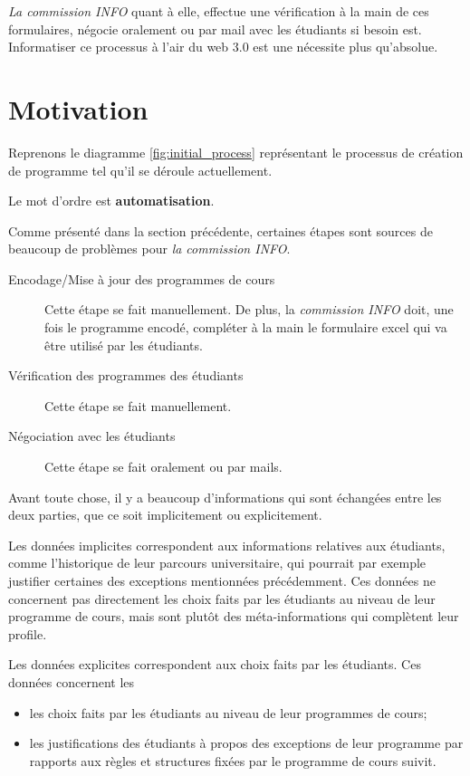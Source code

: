 \textit{La commission INFO} quant à elle, effectue une vérification à la main de ces formulaires, négocie oralement ou par mail avec les étudiants si besoin est. 
Informatiser ce processus à l'air du web 3.0 est une nécessite plus qu'absolue.



\section{Motivation}
Reprenons le diagramme \ref{fig:initial_process} représentant le processus de création de programme tel qu'il se déroule actuellement. 

Le mot d'ordre est \textbf{automatisation}.

Comme présenté dans la section précédente, certaines étapes sont sources de beaucoup de problèmes pour \textit{la commission INFO}.

\begin{description}
  \item[Encodage/Mise à jour des programmes de cours] Cette étape se fait manuellement. De plus, la \textit{ commission INFO} doit, une fois le programme encodé, compléter à la main le formulaire excel qui va être utilisé par les étudiants. 
  \item[Vérification des programmes des étudiants]  Cette étape se fait manuellement. 
  \item[Négociation avec les étudiants] Cette étape se fait oralement ou par mails.
\end{description} 

Avant toute chose, il y a beaucoup d'informations qui sont échangées entre les deux parties, que ce soit implicitement ou explicitement.

Les données implicites correspondent aux informations relatives aux étudiants, comme l'historique de leur parcours universitaire, qui pourrait par exemple justifier certaines des exceptions mentionnées précédemment. Ces données ne concernent pas directement les choix faits par les étudiants au niveau de leur programme de cours, mais sont plutôt des méta-informations qui complètent leur profile. 

Les données explicites correspondent aux choix faits par les étudiants. Ces données concernent les
\begin{itemize}
\item les choix faits par les étudiants au niveau de leur programmes de cours;
\item les justifications des étudiants à propos des exceptions de leur programme par rapports aux règles et structures fixées par le programme de cours suivit. 
\end{itemize}

